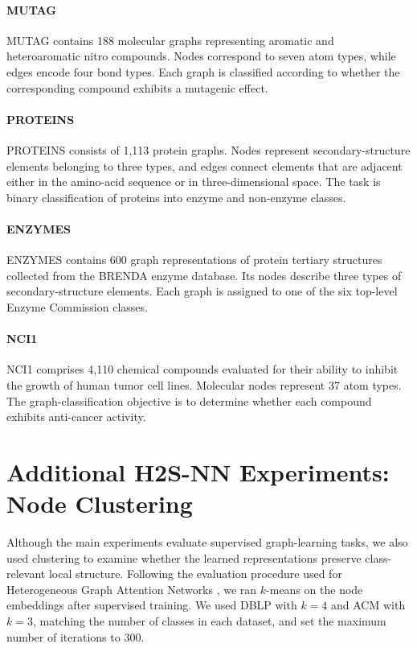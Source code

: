 \documentclass[sigconf,anonymous,review]{acmart}
\newcommand{\method}{\textsc{H2S-NN}}
\begin{document}
\paragraph{MUTAG}
MUTAG contains 188 molecular graphs representing aromatic and heteroaromatic
nitro compounds. Nodes correspond to seven atom types, while edges encode four
bond types. Each graph is classified according to whether the corresponding
compound exhibits a mutagenic effect.
\paragraph{PROTEINS}
PROTEINS consists of 1,113 protein graphs. Nodes represent secondary-structure
elements belonging to three types, and edges connect elements that are
adjacent either in the amino-acid sequence or in three-dimensional space. The
task is binary classification of proteins into enzyme and non-enzyme classes.
\paragraph{ENZYMES}
ENZYMES contains 600 graph representations of protein tertiary structures
collected from the BRENDA enzyme database. Its nodes describe three types of
secondary-structure elements. Each graph is assigned to one of the six
top-level Enzyme Commission classes.
\paragraph{NCI1}
NCI1 comprises 4,110 chemical compounds evaluated for their ability to inhibit
the growth of human tumor cell lines. Molecular nodes represent 37 atom types.
The graph-classification objective is to determine whether each compound
exhibits anti-cancer activity.




\section{Additional \method{} Experiments: Node Clustering}
\label{sec:additional-clustering}

Although the main experiments evaluate supervised graph-learning tasks, we also used clustering
to examine whether the learned representations preserve class-relevant local structure. Following
the evaluation procedure used for Heterogeneous Graph Attention Networks
\cite{wang2019han}, we ran $k$-means on the node embeddings after supervised training. We used
DBLP with $k=4$ and ACM with $k=3$, matching the number of classes in each dataset, and set the
maximum number of iterations to 300.
\end{document}
